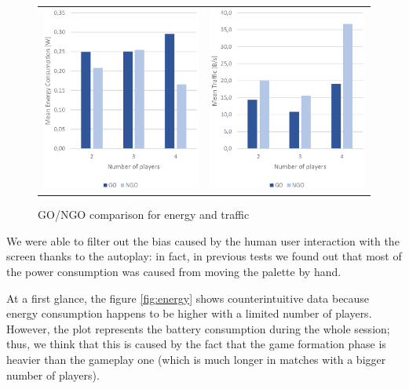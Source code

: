 \begin{figure}[H]
  \centering
  \begin{tabular}{@{}c@{}c}
      \includegraphics[width=.5\columnwidth]{img/energy.eps}
      \label{fig:energy}
    &
    \includegraphics[width=.5\columnwidth]{img/traffic.eps}
    \label{fig:traffic}
  \end{tabular}
  \caption{GO/NGO comparison for energy and traffic}\label{fig:comparison}
\end{figure}


We were able to filter out the bias caused by the human user interaction with
the screen thanks to the autoplay: in fact, in previous tests we found out
that most of the power consumption was caused from moving the palette by hand.

At a first glance, the figure \ref{fig:energy} shows counterintuitive data
because energy consumption happens to be higher with a limited number of
players. However, the plot represents the  battery consumption
during the whole session; thus, we think that this is caused by the fact that
the game formation phase is heavier than the gameplay one (which is much longer
in matches with a bigger number of players).

